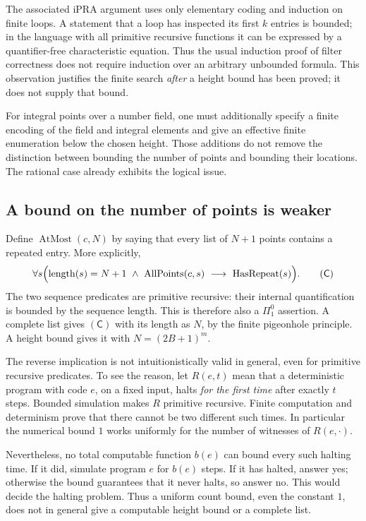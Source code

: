 The associated iPRA argument uses only elementary coding and induction on
finite loops.  A statement that a loop has inspected its first $k$ entries is
bounded; in the language with all primitive recursive functions it can be
expressed by a quantifier-free characteristic equation.  Thus the usual
induction proof of filter correctness does not require induction over an
arbitrary unbounded formula.  This observation justifies the finite search
\emph{after} a height bound has been proved; it does not supply that bound.

For integral points over a number field, one must additionally specify a
finite encoding of the field and integral elements and give an effective
finite enumeration below the chosen height.  Those additions do not remove
the distinction between bounding the number of points and bounding their
locations.  The rational case already exhibits the logical issue.

\subsection{A bound on the number of points is weaker}

Define $\operatorname{AtMost}(c,N)$ by saying that every list of $N+1$ points
contains a repeated entry.  More explicitly,
\[
 \forall s\Bigl(
   \operatorname{length}(s)=N+1\ \wedge\
   \operatorname{AllPoints}(c,s)
   \ \longrightarrow\
   \operatorname{HasRepeat}(s)\Bigr).
 \tag{\textsf{C}}
\]
The two sequence predicates are primitive recursive: their internal
quantification is bounded by the sequence length.  This is therefore also a
$\Pi^0_1$ assertion.  A complete list gives $(\mathsf C)$ with its length as
$N$, by the finite pigeonhole principle.  A height bound gives it with
$N=(2B+1)^m$.

The reverse implication is not intuitionistically valid in general, even
for primitive recursive predicates.  To see the reason, let $R(e,t)$ mean
that a deterministic program with code $e$, on a fixed input, halts
\emph{for the first time} after exactly $t$ steps.  Bounded simulation makes
$R$ primitive recursive.  Finite computation and determinism prove that
there cannot be two different such times.  In particular the numerical
bound $1$ works uniformly for the number of witnesses of $R(e,\cdot)$.

Nevertheless, no total computable function $b(e)$ can bound every such
halting time.  If it did, simulate program $e$ for $b(e)$ steps.  If it has
halted, answer yes; otherwise the bound guarantees that it never halts, so
answer no.  This would decide the halting problem.  Thus a uniform count
bound, even the constant $1$, does not in general give a computable height
bound or a complete list.

